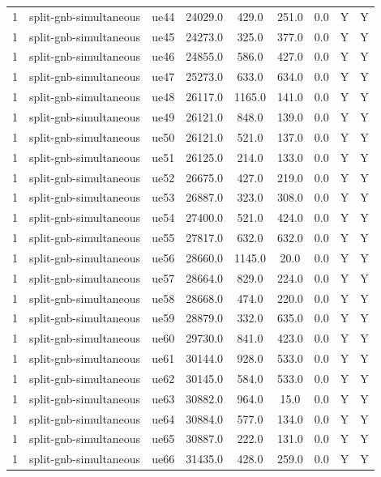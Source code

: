 \begin{table}[ht]
\begin{tabular}{|c|c|c|c|c|c|c|c|c|}
1 & split-gnb-simultaneous & ue44 & 24029.0 & 429.0 & 251.0 & 0.0 & Y & Y \\
1 & split-gnb-simultaneous & ue45 & 24273.0 & 325.0 & 377.0 & 0.0 & Y & Y \\
1 & split-gnb-simultaneous & ue46 & 24855.0 & 586.0 & 427.0 & 0.0 & Y & Y \\
1 & split-gnb-simultaneous & ue47 & 25273.0 & 633.0 & 634.0 & 0.0 & Y & Y \\
1 & split-gnb-simultaneous & ue48 & 26117.0 & 1165.0 & 141.0 & 0.0 & Y & Y \\
1 & split-gnb-simultaneous & ue49 & 26121.0 & 848.0 & 139.0 & 0.0 & Y & Y \\
1 & split-gnb-simultaneous & ue50 & 26121.0 & 521.0 & 137.0 & 0.0 & Y & Y \\
1 & split-gnb-simultaneous & ue51 & 26125.0 & 214.0 & 133.0 & 0.0 & Y & Y \\
1 & split-gnb-simultaneous & ue52 & 26675.0 & 427.0 & 219.0 & 0.0 & Y & Y \\
1 & split-gnb-simultaneous & ue53 & 26887.0 & 323.0 & 308.0 & 0.0 & Y & Y \\
1 & split-gnb-simultaneous & ue54 & 27400.0 & 521.0 & 424.0 & 0.0 & Y & Y \\
1 & split-gnb-simultaneous & ue55 & 27817.0 & 632.0 & 632.0 & 0.0 & Y & Y \\
1 & split-gnb-simultaneous & ue56 & 28660.0 & 1145.0 & 20.0 & 0.0 & Y & Y \\
1 & split-gnb-simultaneous & ue57 & 28664.0 & 829.0 & 224.0 & 0.0 & Y & Y \\
1 & split-gnb-simultaneous & ue58 & 28668.0 & 474.0 & 220.0 & 0.0 & Y & Y \\
1 & split-gnb-simultaneous & ue59 & 28879.0 & 332.0 & 635.0 & 0.0 & Y & Y \\
1 & split-gnb-simultaneous & ue60 & 29730.0 & 841.0 & 423.0 & 0.0 & Y & Y \\
1 & split-gnb-simultaneous & ue61 & 30144.0 & 928.0 & 533.0 & 0.0 & Y & Y \\
1 & split-gnb-simultaneous & ue62 & 30145.0 & 584.0 & 533.0 & 0.0 & Y & Y \\
1 & split-gnb-simultaneous & ue63 & 30882.0 & 964.0 & 15.0 & 0.0 & Y & Y \\
1 & split-gnb-simultaneous & ue64 & 30884.0 & 577.0 & 134.0 & 0.0 & Y & Y \\
1 & split-gnb-simultaneous & ue65 & 30887.0 & 222.0 & 131.0 & 0.0 & Y & Y \\
1 & split-gnb-simultaneous & ue66 & 31435.0 & 428.0 & 259.0 & 0.0 & Y & Y \\

\end{tabular}
\end{table}
